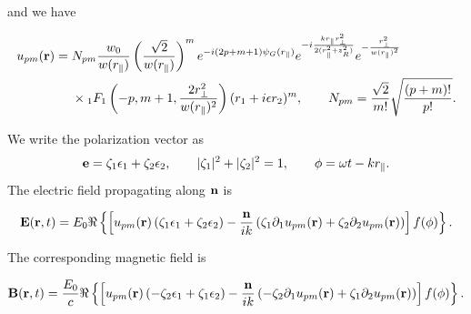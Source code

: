 and we have
\begin{importantbox}
    \begin{align}
        u_{pm}({\bf r})={} & N_{pm}\frac{w_0}{w(r_{\parallel})}
        \left(\frac{\sqrt{2}}{w(r_{\parallel})}\right)^m
        e^{-i(2p+m+1)\psi_G(r_{\parallel})} e^{-i\frac{k r_{\parallel} r_{\perp}^2}{2 (r_{\parallel}^2 + z_R^2)}}
        e^{-\frac{r_{\perp}^2}{w(r_{\parallel})^2}}\nonumber                                          \\
                           & \times{}_1F_1\left(-p,m+1,\frac{2r_{\perp}^2}{w(r_{\parallel})^2}\right)
        (r_1+i\epsilon r_2)^m,
        \qquad
        N_{pm}=\frac{\sqrt{2}}{m!}\sqrt{\frac{(p+m)!}{p!}}.
    \end{align}
\end{importantbox}
We write the polarization vector as
\begin{align}
    {\bf e} = \zeta_1{\bf \epsilon}_1+\zeta_2{\bf \epsilon}_2,\qquad
    |\zeta_1|^2+|\zeta_2|^2=1,\qquad
    \phi=\omega t-k r_{\parallel}.
\end{align}
The electric field propagating along ${\bf n}$ is
\begin{highlightbox}[title={Electric field for an arbitrary propagation direction}]
    \begin{align}
        {\bf E}({\bf r},t)=E_0\Re\left\{
        \left[u_{pm}({\bf r})\left(\zeta_1{\bf \epsilon}_1+\zeta_2{\bf \epsilon}_2\right)
            -\frac{{\bf n}}{ik}\left(\zeta_1\partial_1u_{pm}({\bf r})
            +\zeta_2\partial_2u_{pm}({\bf r})\right)\right]f(\phi)\right\}.
    \end{align}
\end{highlightbox}
The corresponding magnetic field is
\begin{highlightbox}[title={Magnetic field for an arbitrary propagation direction}]
    \begin{align}
        {\bf B}({\bf r},t)=\frac{E_0}{c}\Re\left\{
        \left[u_{pm}({\bf r})\left(-\zeta_2{\bf \epsilon}_1+\zeta_1{\bf \epsilon}_2\right)
            -\frac{{\bf n}}{ik}\left(-\zeta_2\partial_1u_{pm}({\bf r})
            +\zeta_1\partial_2u_{pm}({\bf r})\right)\right]f(\phi)\right\}.
    \end{align}
\end{highlightbox}

